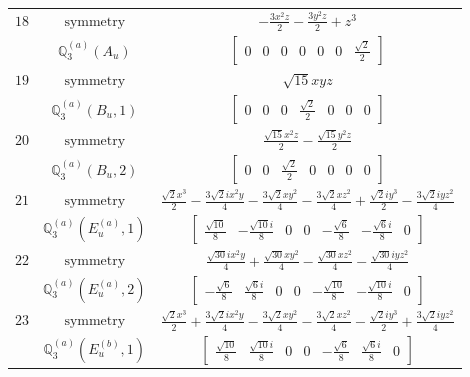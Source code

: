 \documentclass[fleqn,8pt,landscape]{jsarticle}
\begin{document}
\begin{longtable}{ccc}
$ 18 $ & $ \text{symmetry} $ & $ - \frac{3 x^{2} z}{2} - \frac{3 y^{2} z}{2} + z^{3} $ \\
$  $ & $ \mathbb{Q}_{3}^{(a)}(A_{u}) $ & $ \begin{bmatrix} 0 & 0 & 0 & 0 & 0 & 0 & \frac{\sqrt{2}}{2} \end{bmatrix} $ \\ \hline
$ 19 $ & $ \text{symmetry} $ & $ \sqrt{15} x y z $ \\
$  $ & $ \mathbb{Q}_{3}^{(a)}(B_{u},1) $ & $ \begin{bmatrix} 0 & 0 & 0 & \frac{\sqrt{2}}{2} & 0 & 0 & 0 \end{bmatrix} $ \\ \hline
$ 20 $ & $ \text{symmetry} $ & $ \frac{\sqrt{15} x^{2} z}{2} - \frac{\sqrt{15} y^{2} z}{2} $ \\
$  $ & $ \mathbb{Q}_{3}^{(a)}(B_{u},2) $ & $ \begin{bmatrix} 0 & 0 & \frac{\sqrt{2}}{2} & 0 & 0 & 0 & 0 \end{bmatrix} $ \\ \hline
$ 21 $ & $ \text{symmetry} $ & $ \frac{\sqrt{2} x^{3}}{2} - \frac{3 \sqrt{2} i x^{2} y}{4} - \frac{3 \sqrt{2} x y^{2}}{4} - \frac{3 \sqrt{2} x z^{2}}{4} + \frac{\sqrt{2} i y^{3}}{2} - \frac{3 \sqrt{2} i y z^{2}}{4} $ \\
$  $ & $ \mathbb{Q}_{3}^{(a)}(E_{u}^{(a)},1) $ & $ \begin{bmatrix} \frac{\sqrt{10}}{8} & - \frac{\sqrt{10} i}{8} & 0 & 0 & - \frac{\sqrt{6}}{8} & - \frac{\sqrt{6} i}{8} & 0 \end{bmatrix} $ \\ \hline
$ 22 $ & $ \text{symmetry} $ & $ \frac{\sqrt{30} i x^{2} y}{4} + \frac{\sqrt{30} x y^{2}}{4} - \frac{\sqrt{30} x z^{2}}{4} - \frac{\sqrt{30} i y z^{2}}{4} $ \\
$  $ & $ \mathbb{Q}_{3}^{(a)}(E_{u}^{(a)},2) $ & $ \begin{bmatrix} - \frac{\sqrt{6}}{8} & \frac{\sqrt{6} i}{8} & 0 & 0 & - \frac{\sqrt{10}}{8} & - \frac{\sqrt{10} i}{8} & 0 \end{bmatrix} $ \\ \hline
$ 23 $ & $ \text{symmetry} $ & $ \frac{\sqrt{2} x^{3}}{2} + \frac{3 \sqrt{2} i x^{2} y}{4} - \frac{3 \sqrt{2} x y^{2}}{4} - \frac{3 \sqrt{2} x z^{2}}{4} - \frac{\sqrt{2} i y^{3}}{2} + \frac{3 \sqrt{2} i y z^{2}}{4} $ \\
$  $ & $ \mathbb{Q}_{3}^{(a)}(E_{u}^{(b)},1) $ & $ \begin{bmatrix} \frac{\sqrt{10}}{8} & \frac{\sqrt{10} i}{8} & 0 & 0 & - \frac{\sqrt{6}}{8} & \frac{\sqrt{6} i}{8} & 0 \end{bmatrix} $ \\ \hline

\end{longtable}
\end{document}
